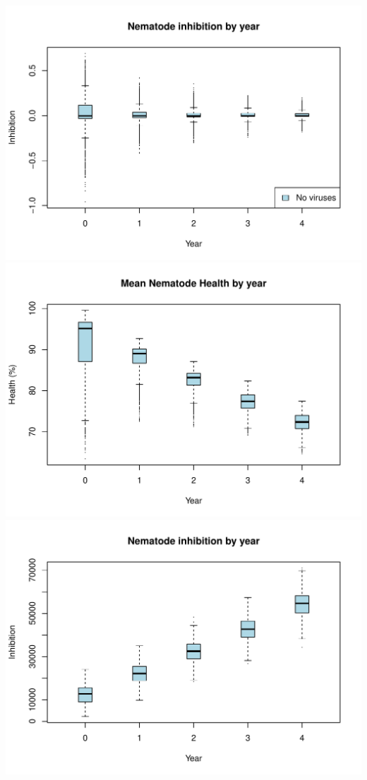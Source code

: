 \documentclass[11pt]{article}
\begin{document}
\begin{knitrout}
{\centering \includegraphics{figure/box-more1} 
\includegraphics{figure/box-more2} 
\includegraphics{figure/box-more3} 

}



\end{knitrout}
\end{document}
